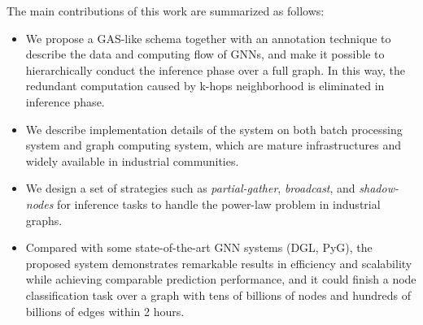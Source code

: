 \documentclass[conference]{IEEEtran}
\begin{document}
The main contributions of this work are summarized as follows:
\begin{itemize}
    \item We propose a GAS-like schema together with an annotation technique to describe the data and computing flow of GNNs, and make it possible to hierarchically conduct the inference phase over a full graph.
In this way, the redundant computation caused by k-hops neighborhood is eliminated in inference phase.
    \item We describe implementation details of the system on both batch processing system\cite{b20,b21} and graph computing system\cite{b22}, which are mature infrastructures and widely available in industrial communities.
    \item  We design a set of strategies such as \emph{partial-gather}, \emph{broadcast}, and \emph{shadow-nodes} for inference tasks to handle the power-law problem in industrial graphs.
    \item Compared with some state-of-the-art GNN systems (DGL, PyG), the proposed system demonstrates remarkable results in efficiency and scalability while achieving comparable prediction performance, and it could finish a node classification task over a graph with tens of billions of nodes and hundreds of billions of edges within 2 hours.  
\end{itemize}
\end{document}
